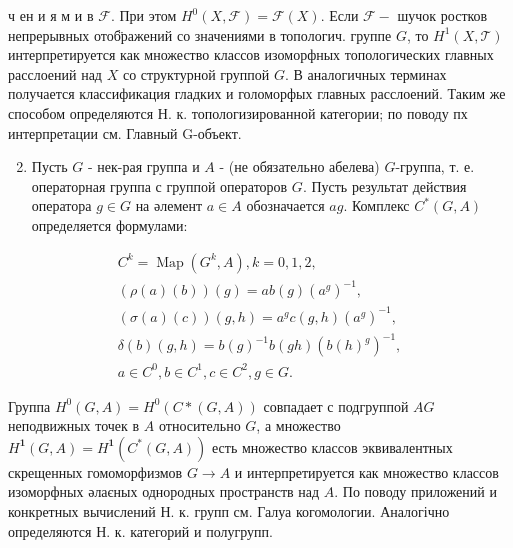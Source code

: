 \documentclass[10pt]{article}
\begin{document}
ч ен и я м и в $\mathscr{F}$. При этом $H^{0}(X, \mathscr{F})=\mathscr{F}(X)$. Если $\mathscr{F}-$ шучок ростков непрерывных отоб̈ражений со значениями в топологич. группе $G$, то $H^{1}(X, \mathscr{T})$ интерпретируется как множество классов изоморфных топологических главных расслоений над $X$ со структурной группой $G$. В аналогичных терминах получается классификация гладких и голоморфых главных расслоений. Таким же способом определяются Н. к. топологизированной категории; по поводу пх интерпретации см. Главный G-объект.



\begin{enumerate}

  \setcounter{enumi}{1}

  \item Пусть $G$ - нек-рая группа и $A$ - (не обязательно абелева) $G$-группа, т. е. операторная группа с группой операторов $G$. Пусть результат действия оператора $g \in G$ на әлемент $a \in A$ обозначается $a g$. Комплекс $C^{*}(G, A)$ определяется формулами:

\end{enumerate}



\[

\begin{gathered}

C^{k}=\operatorname{Map}\left(G^{k}, A\right), k=0,1,2, \\

(\rho(a)(b))(g)=a b(g)\left(a^{g}\right)^{-1}, \\

(\sigma(a)(c))(g, h)=a^{g} c(g, h)\left(a^{g}\right)^{-1}, \\

\delta(b)(g, h)=b(g)^{-1} b(g h)\left(b(h)^{g}\right)^{-1}, \\

a \in C^{0}, b \in C^{1}, c \in C^{2}, g \in G .

\end{gathered}

\]



Группа $H^{0}(G, A)=H^{0}(C *(G, A))$ совпадает с подгруппой $A G$ неподвижных точек в $A$ относительно $G$, а множество $H^{\mathbf{1}}(G, A)=H^{\mathbf{1}}\left(C^{*}(G, A)\right)$ есть множество классов эквивалентных скрещенных гомоморфизмов $G \rightarrow A$ и интерпретируется как множество классов изоморфных әлаєных однородных пространств над $A$. По поводу приложений и конкретных вычислений Н. к. групп см. Галуа когомологии. Аналогічно определяются Н. к. категорий и полугрупп.
\end{document}
